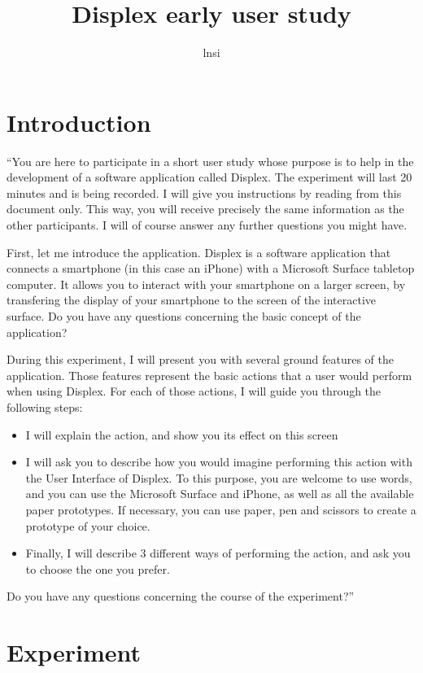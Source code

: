 \documentclass[11pt]{amsart}
\title{Displex early user study}
\author{lnsi}
\begin{document}
\maketitle

\section{Introduction}
``You are here to participate in a short user study whose purpose is to help in the development of a software application called Displex.
The experiment will last 20 minutes and is being recorded.
I will give you instructions by reading from this document only.
This way, you will receive precisely the same information as the other participants.
I will of course answer any further questions you might have.

First, let me introduce the application.
Displex is a software application that connects a smartphone (in this case an iPhone) with a Microsoft Surface tabletop computer.
It allows you to interact with your smartphone on a larger screen, by transfering the display of your smartphone to the screen of the interactive surface.
Do you have any questions concerning the basic concept of the application?

During this experiment, I will present you with several ground features of the application.
Those features represent the basic actions that a user would perform when using Displex.
For each of those actions, I will guide you through the following steps:

\begin{itemize}
\item{I will explain the action, and show you its effect on this screen}
\item{I will ask you to describe how you would imagine performing this action with the User Interface of Displex.
To this purpose, you are welcome to use words, and you can use the Microsoft Surface and iPhone, as well as all the available paper prototypes. If necessary, you can use paper, pen and scissors to create a prototype of your choice.}
\item{Finally, I will describe 3 different ways of performing the action, and ask you to choose the one you prefer.}
\end{itemize}
Do you have any questions concerning the course of the experiment?''

\pagebreak

\section{Experiment}
\end{document}
